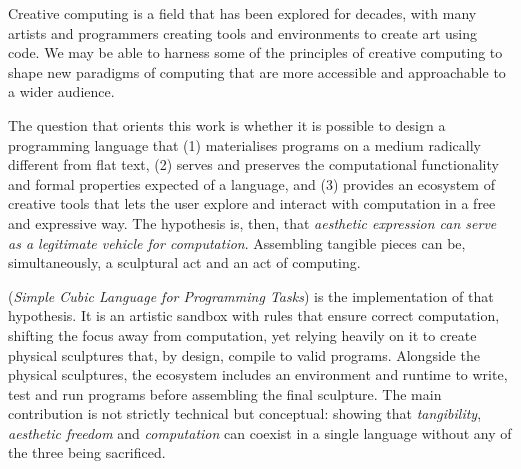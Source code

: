 Creative computing is a field that has been explored for decades, with many artists and programmers creating tools and environments to create art using code.
We may be able to harness some of the principles of creative computing to shape new paradigms of computing that are more accessible and approachable to a wider audience.

The question that orients this work is whether it is possible to design a programming language that (1) materialises programs on a medium radically different from flat text, (2) serves and preserves the computational functionality and formal properties expected of a language, and (3) provides an ecosystem of creative tools that lets the user explore and interact with computation in a free and expressive way.
The hypothesis is, then, that \emph{aesthetic expression can serve as a legitimate vehicle for computation}.
Assembling tangible pieces can be, simultaneously, a sculptural act and an act of computing.

\sculpt (\emph{Simple Cubic Language for Programming Tasks}) is the implementation of that hypothesis.
It is an artistic sandbox with rules that ensure correct computation, shifting the focus away from computation, yet relying heavily on it to create physical sculptures that, by design, compile to valid programs.
Alongside the physical sculptures, the \sculpt ecosystem includes an environment and runtime to write, test and run programs before assembling the final sculpture.
The main contribution is not strictly technical but conceptual: showing that \emph{tangibility}, \emph{aesthetic freedom} and \emph{computation} can coexist in a single language without any of the three being sacrificed.

\endinput